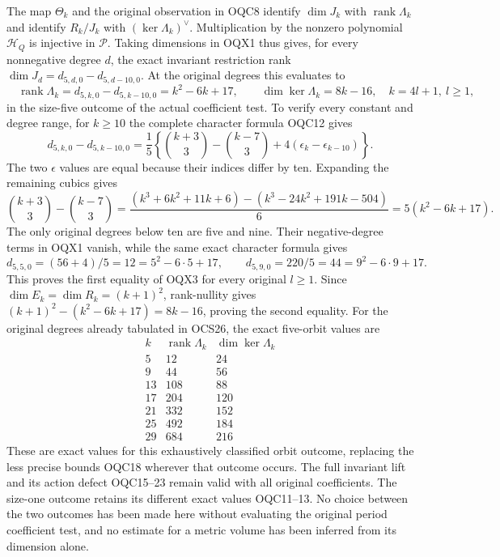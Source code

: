 \documentclass[11pt,a4paper]{article}
\begin{document}
The map $\Theta_k$ and the original observation in OQC8 identify
$\dim J_k$ with $\operatorname{rank}\Lambda_k$ and identify
$R_k/J_k$ with $(\ker\Lambda_k)^\vee$. Multiplication by the
nonzero polynomial $\mathcal H_Q$ is injective in $\mathscr P$.
Taking dimensions in OQX1 thus gives, for every nonnegative degree
$d$, the exact invariant restriction rank
$\dim J_d=d_{5,d,0}-d_{5,d-10,0}$. At the original degrees this
evaluates to
\[
 \boxed{\quad
 \operatorname{rank}\Lambda_k
      =d_{5,k,0}-d_{5,k-10,0}
      =k^2-6k+17,\qquad
 \dim\ker\Lambda_k=8k-16,
 \quad k=4l+1,\ l\geq1,
 \quad}\tag{OQX3}
\]
in the size-five outcome of the actual coefficient test.
To verify every constant and degree range, for $k\geq10$ the
complete character formula OQC12 gives
\[
 d_{5,k,0}-d_{5,k-10,0}
 =\frac15\left\{\binom{k+3}{3}-\binom{k-7}{3}
                         +4(\epsilon_k-\epsilon_{k-10})\right\}.
\]
The two $\epsilon$ values are equal because their indices differ
by ten. Expanding the remaining cubics gives
\[
 \binom{k+3}{3}-\binom{k-7}{3}
 =\frac{(k^3+6k^2+11k+6)
             -(k^3-24k^2+191k-504)}6
 =5(k^2-6k+17).
\]
The only original degrees below ten are five and nine. Their
negative-degree terms in OQX1 vanish, while the same exact
character formula gives
\[
 d_{5,5,0}=(56+4)/5=12=5^2-6\cdot5+17,
 \qquad
 d_{5,9,0}=220/5=44=9^2-6\cdot9+17.
\]
This proves the first equality of OQX3 for every original $l\geq1$.
Since $\dim E_k=\dim R_k=(k+1)^2$, rank-nullity gives
$(k+1)^2-(k^2-6k+17)=8k-16$, proving the second equality.
For the original degrees already tabulated in OCS26, the exact
five-orbit values are
\[
 \begin{array}{c|r|r}
 k&\operatorname{rank}\Lambda_k&\dim\ker\Lambda_k\\\hline
 5&12&24\\
 9&44&56\\
 13&108&88\\
 17&204&120\\
 21&332&152\\
 25&492&184\\
 29&684&216
 \end{array}
\]
These are exact values for this exhaustively classified orbit
outcome, replacing the less precise bounds OQC18 wherever that
outcome occurs. The full invariant lift and its action defect
OQC15--23 remain valid with all original coefficients. The
size-one outcome retains its different exact values OQC11--13.
No choice between the two outcomes has been made here without
evaluating the original period coefficient test, and no estimate
for a metric volume has been inferred from its dimension alone.
\end{document}
